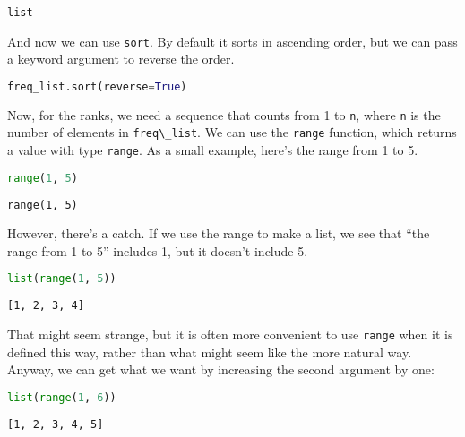 \begin{lstlisting}[style=output]
list
\end{lstlisting}

And now we can use \passthrough{\lstinline!sort!}. By default it sorts
in ascending order, but we can pass a keyword argument to reverse the
order.

\begin{lstlisting}[language=Python,style=source]
freq_list.sort(reverse=True)
\end{lstlisting}

Now, for the ranks, we need a sequence that counts from 1 to
\passthrough{\lstinline!n!}, where \passthrough{\lstinline!n!} is the
number of elements in \passthrough{\lstinline!freq\_list!}. We can use
the \passthrough{\lstinline!range!} function, which returns a value with
type \passthrough{\lstinline!range!}. As a small example, here's the
range from 1 to 5.

\begin{lstlisting}[language=Python,style=source]
range(1, 5)
\end{lstlisting}

\begin{lstlisting}[style=output]
range(1, 5)
\end{lstlisting}

However, there's a catch. If we use the range to make a list, we see
that ``the range from 1 to 5'' includes 1, but it doesn't include 5.

\begin{lstlisting}[language=Python,style=source]
list(range(1, 5))
\end{lstlisting}

\begin{lstlisting}[style=output]
[1, 2, 3, 4]
\end{lstlisting}

That might seem strange, but it is often more convenient to use
\passthrough{\lstinline!range!} when it is defined this way, rather than
what might seem like the more natural way. Anyway, we can get what we
want by increasing the second argument by one:

\begin{lstlisting}[language=Python,style=source]
list(range(1, 6))
\end{lstlisting}

\begin{lstlisting}[style=output]
[1, 2, 3, 4, 5]
\end{lstlisting}


